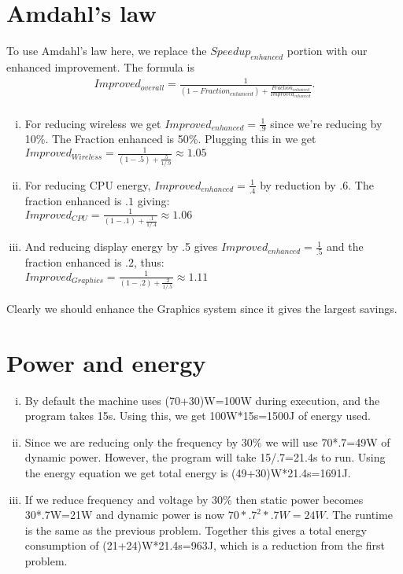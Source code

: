 \documentclass[a4paper,11pt]{article}
\theoremstyle{mytheor}
\begin{document}
\section{Amdahl's law}
To use Amdahl's law here, we replace the $Speedup_{enhanced}$ portion with our enhanced improvement. The formula is
\begin{align*}
Improved_{overall} = \frac{1}{(1-Fraction_{enhanced}) + \frac{Fraction_{enhanced}}{Improved_{enhanced}}}.\\
\end{align*}
\begin{enumerate}[i.]
\item For reducing wireless we get $Improved_{enhanced} = \frac{1}{.9}$ since we're reducing by 10\%. The Fraction enhanced is 50\%. Plugging this in we get\\
$Improved_{Wireless} = \frac{1}{(1-.5) + \frac{.5}{1/.9}}\approx1.05$
\item For reducing CPU energy, $Improved_{enhanced}=\frac{1}{.4}$ by reduction by .6. The fraction enhanced is $.1$ giving:\\
$Improved_{CPU} = \frac{1}{(1-.1) + \frac{.1}{1/.4}}\approx1.06$
\item And reducing display energy by .5 gives $Improved_{enhanced}=\frac{1}{.5}$ and the fraction enhanced is $.2$, thus:\\
$Improved_{Graphics} = \frac{1}{(1-.2) + \frac{.2}{1/.5}}\approx1.11$
\end{enumerate}
Clearly we should enhance the Graphics system since it gives the largest savings.

\section{Power and energy}
\begin{enumerate}[i.]
\item By default the machine uses (70+30)W=100W during execution, and the program takes 15s. Using this, we get 100W*15s=1500J of energy used.
\item Since we are reducing only the frequency by 30\% we will use 70*.7=49W of dynamic power. However, the program will take 15/.7=21.4s to run. Using the energy equation we get total energy is (49+30)W*21.4s=1691J.
\item If we reduce frequency and voltage by 30\% then static power becomes 30*.7W=21W and dynamic power is now $70*.7^2*.7W=24W$. The runtime is the same as the previous problem. Together this gives a total energy consumption of (21+24)W*21.4s=963J, which is a reduction from the first problem.
\end{enumerate}
\end{document}
